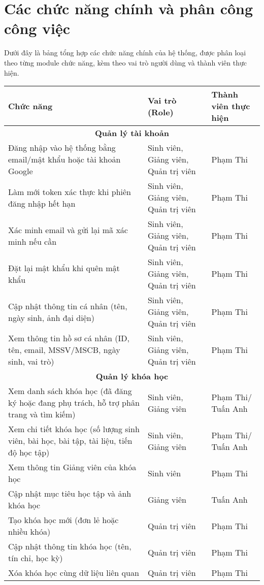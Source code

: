 \section{Các chức năng chính và phân công công việc}
Dưới đây là bảng tổng hợp các chức năng chính của hệ thống, được phân loại theo từng module chức năng, kèm theo vai trò người dùng và thành viên thực hiện.

\begin{longtable}{|p{8cm}|p{3cm}|p{2cm}|}
\hline
\textbf{Chức năng} & \textbf{Vai trò (Role)} & \textbf{Thành viên thực hiện} \\ \hline
\endhead
\multicolumn{3}{|c|}{\textbf{Quản lý tài khoản}} \\ \hline
Đăng nhập vào hệ thống bằng email/mật khẩu hoặc tài khoản Google & Sinh viên, Giảng viên, Quản trị viên & Phạm Thi\\ \hline
Làm mới token xác thực khi phiên đăng nhập hết hạn & Sinh viên, Giảng viên, Quản trị viên & Phạm Thi\\ \hline
Xác minh email và gửi lại mã xác minh nếu cần & Sinh viên, Giảng viên, Quản trị viên & Phạm Thi\\ \hline
Đặt lại mật khẩu khi quên mật khẩu & Sinh viên, Giảng viên, Quản trị viên & Phạm Thi\\ \hline
Cập nhật thông tin cá nhân (tên, ngày sinh, ảnh đại diện) & Sinh viên, Giảng viên, Quản trị viên & Phạm Thi\\ \hline
Xem thông tin hồ sơ cá nhân (ID, tên, email, MSSV/MSCB, ngày sinh, vai trò) & Sinh viên, Giảng viên, Quản trị viên & Phạm Thi\\ \hline
\multicolumn{3}{|c|}{\textbf{Quản lý khóa học}} \\ \hline
Xem danh sách khóa học (đã đăng ký hoặc đang phụ trách, hỗ trợ phân trang và tìm kiếm) & Sinh viên, Giảng viên & Phạm Thi/ Tuấn Anh \\ \hline
Xem chi tiết khóa học (số lượng sinh viên, bài học, bài tập, tài liệu, tiến độ học tập) & Sinh viên, Giảng viên & Phạm Thi/ Tuấn Anh\\ \hline
Xem thông tin Giảng viên của khóa học & Sinh viên & Phạm Thi\\ \hline
Cập nhật mục tiêu học tập và ảnh khóa học & Giảng viên & Tuấn Anh \\ \hline
Tạo khóa học mới (đơn lẻ hoặc nhiều khóa) & Quản trị viên & Phạm Thi\\ \hline
Cập nhật thông tin khóa học (tên, tín chỉ, học kỳ) & Quản trị viên & Phạm Thi\\ \hline
Xóa khóa học cùng dữ liệu liên quan & Quản trị viên & Phạm Thi\\ \hline

\end{longtable}
